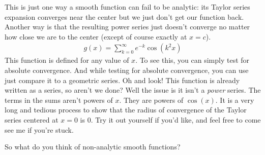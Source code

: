 \documentclass{ximera}
\begin{document}
\begin{exercise}
\begin{exercise}
		This is just one way a smooth function can fail to be analytic: its Taylor series expansion converges near the center but we just don't get our function back. Another way is that the resulting power series just doesn't converge no matter how close we are to the center (except of course exactly at $x=c$).
		\begin{align}
			g(x)=\sum_{k=0}^\infty e^{-k}\cos(k^2 x)
		\end{align}
		This function is defined for any value of $x$. To see this, you can simply test for absolute convergence. And while testing for absolute convergence, you can use just compare it to a geometric series. Oh and look! This function is already written as a series, so aren't we done? Well the issue is it isn't a \emph{power} series. The terms in the sums aren't powers of $x$. They are powers of $\cos(x)$. It is a very long and tedious process to show that the radius of convergence of the Taylor series centered at $x=0$ is $0$. Try it out yourself if you'd like, and feel free to come see me if you're stuck.
		
		So what do you think of non-analytic smooth functions?
		\begin{multipleChoice}
		\end{multipleChoice}
		
		
		
	\end{exercise}
	
\end{exercise}
\end{document}
